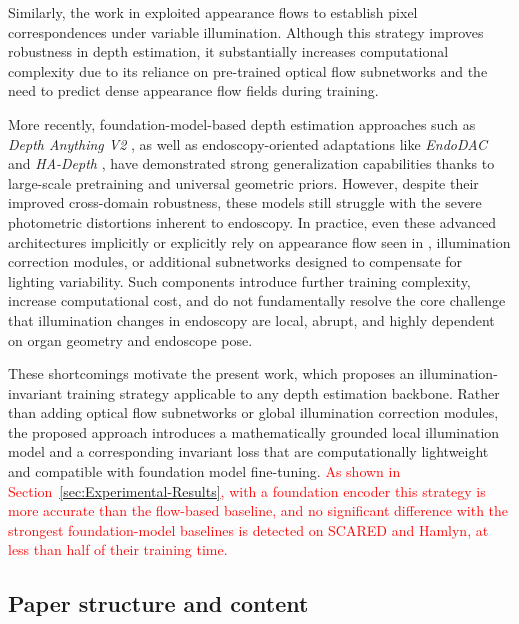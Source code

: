 \documentclass[a4paper,fleqn]{cas-dc}
\begin{document}
Similarly, the work in \citep{Shao_MIA_2022} exploited appearance flows to establish pixel correspondences under variable illumination. Although this strategy improves robustness in depth estimation, it substantially increases computational complexity due to its reliance on pre-trained optical flow subnetworks and the need to predict dense appearance flow fields during training.

More recently, foundation-model-based depth estimation approaches such as \emph{Depth Anything V2} \citep{DepthAnythingV2_2024}, as well as endoscopy-oriented adaptations like \emph{EndoDAC} \citep{EndoDAC_MICCAI_2024} and \emph{HA-Depth} \citep{HAdepth_2025}, have demonstrated strong generalization capabilities thanks to large-scale pretraining and universal geometric priors. However, despite their improved cross-domain robustness, these models still struggle with the severe photometric distortions inherent to endoscopy. In practice, even these advanced architectures implicitly or explicitly rely on appearance flow seen in \citep{Shao_MIA_2022} , illumination correction modules, or additional subnetworks designed to compensate for lighting variability. Such components introduce further training complexity, increase computational cost, and do not fundamentally resolve the core challenge that illumination changes in endoscopy are local, abrupt, and highly dependent on organ geometry and endoscope pose.

These shortcomings motivate the present work, which proposes an illumination-invariant training strategy applicable to any depth estimation backbone. Rather than adding optical flow subnetworks or global illumination correction modules, the proposed approach introduces a mathematically grounded local illumination model and a corresponding invariant loss that are computationally lightweight and compatible with 
foundation model fine-tuning. \textcolor{red}{As shown in Section~\ref{sec:Experimental-Results}, with a foundation encoder this strategy is more accurate than the flow-based baseline, and no significant difference with the strongest foundation-model baselines is detected on SCARED and Hamlyn, at less than half of their training time.}
%
\subsection{Paper structure and content}
%
\end{document}

